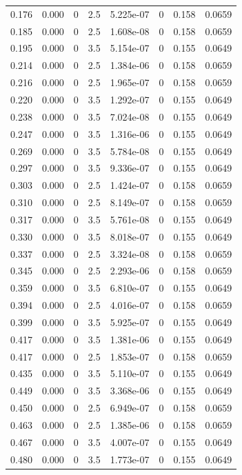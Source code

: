 \documentclass[preview]{standalone}
\begin{document}
{{\begin{tabular}{L{1.2cm}C{1.2cm} C{0.3cm}C{0.5cm} C{1.4cm}C{1.4cm} C{1.4cm}C{1.4cm}}
  0.176  &  0.000  & 0     & 2.5 &  5.225e-07  & 0  & 0.158 &  0.0659   \\ 
  0.185  &  0.000  & 0     & 2.5 &  1.608e-08  & 0  & 0.158 &  0.0659   \\ 
  0.195  &  0.000  & 0     & 3.5 &  5.154e-07  & 0  & 0.155 &  0.0649   \\ 
  0.214  &  0.000  & 0     & 2.5 &  1.384e-06  & 0  & 0.158 &  0.0659   \\ 
  0.216  &  0.000  & 0     & 2.5 &  1.965e-07  & 0  & 0.158 &  0.0659   \\ 
  0.220  &  0.000  & 0     & 3.5 &  1.292e-07  & 0  & 0.155 &  0.0649   \\ 
  0.238  &  0.000  & 0     & 3.5 &  7.024e-08  & 0  & 0.155 &  0.0649   \\ 
  0.247  &  0.000  & 0     & 3.5 &  1.316e-06  & 0  & 0.155 &  0.0649   \\ 
  0.269  &  0.000  & 0     & 3.5 &  5.784e-08  & 0  & 0.155 &  0.0649   \\ 
  0.297  &  0.000  & 0     & 3.5 &  9.336e-07  & 0  & 0.155 &  0.0649   \\ 
  0.303  &  0.000  & 0     & 2.5 &  1.424e-07  & 0  & 0.158 &  0.0659   \\ 
  0.310  &  0.000  & 0     & 2.5 &  8.149e-07  & 0  & 0.158 &  0.0659   \\ 
  0.317  &  0.000  & 0     & 3.5 &  5.761e-08  & 0  & 0.155 &  0.0649   \\ 
  0.330  &  0.000  & 0     & 3.5 &  8.018e-07  & 0  & 0.155 &  0.0649   \\ 
  0.337  &  0.000  & 0     & 2.5 &  3.324e-08  & 0  & 0.158 &  0.0659   \\ 
  0.345  &  0.000  & 0     & 2.5 &  2.293e-06  & 0  & 0.158 &  0.0659   \\ 
  0.359  &  0.000  & 0     & 3.5 &  6.810e-07  & 0  & 0.155 &  0.0649   \\ 
  0.394  &  0.000  & 0     & 2.5 &  4.016e-07  & 0  & 0.158 &  0.0659   \\ 
  0.399  &  0.000  & 0     & 3.5 &  5.925e-07  & 0  & 0.155 &  0.0649   \\ 
  0.417  &  0.000  & 0     & 3.5 &  1.381e-06  & 0  & 0.155 &  0.0649   \\ 
  0.417  &  0.000  & 0     & 2.5 &  1.853e-07  & 0  & 0.158 &  0.0659   \\ 
  0.435  &  0.000  & 0     & 3.5 &  5.110e-07  & 0  & 0.155 &  0.0649   \\ 
  0.449  &  0.000  & 0     & 3.5 &  3.368e-06  & 0  & 0.155 &  0.0649   \\ 
  0.450  &  0.000  & 0     & 2.5 &  6.949e-07  & 0  & 0.158 &  0.0659   \\ 
  0.463  &  0.000  & 0     & 2.5 &  1.385e-06  & 0  & 0.158 &  0.0659   \\ 
  0.467  &  0.000  & 0     & 3.5 &  4.007e-07  & 0  & 0.155 &  0.0649   \\ 
  0.480  &  0.000  & 0     & 3.5 &  1.773e-07  & 0  & 0.155 &  0.0649   \\ 
\hline 
\end{tabular} 

}}
\end{document}
